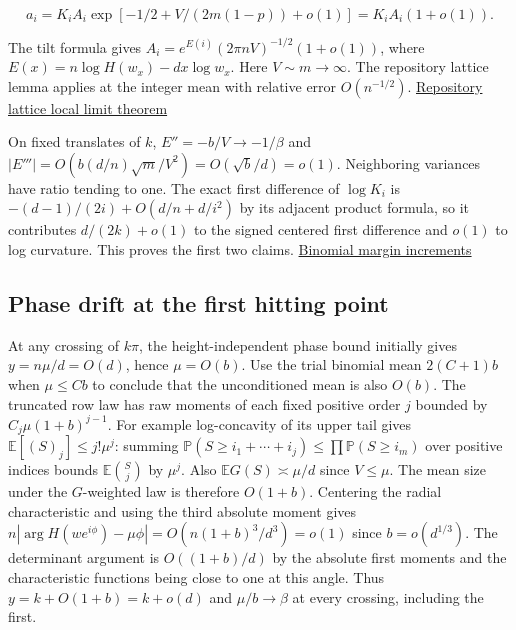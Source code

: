 \begin{equation*}
a_i=K_i A_i\exp[-1/2+V/(2m(1-p))+o(1)]=K_i A_i(1+o(1)).
\end{equation*}

The tilt formula gives $A_i=e^{E(i)}(2\pi n V)^{-1/2}(1+o(1))$, where $E(x)=n\log H(w_x)-dx\log w_x$. Here $V\sim m\to\infty$. The repository lattice lemma applies at the integer mean with relative error $O(n^{-1/2})$. \href{https://github.com/ProgramComputer/open-math-research/blob/605cc467a5be93a8408519da331e46f1008df96e/topics/balanced-arrays/dense-regime/uniform-lattice-lemma.md}{Repository lattice local limit theorem}

On fixed translates of $k$, $E''=-b/V\to-1/\beta$ and $|E'''|=O(b(d/n)\sqrt m/V^2)=O(\sqrt b/d)=o(1)$. Neighboring variances have ratio tending to one. The exact first difference of $\log K_i$ is $-(d-1)/(2i)+O(d/n+d/i^2)$ by its adjacent product formula, so it contributes $d/(2k)+o(1)$ to the signed centered first difference and $o(1)$ to log curvature. This proves the first two claims. \href{https://github.com/ProgramComputer/open-math-research/blob/4fb624ba937a8eecc1361a6066185cd81ab7b172/topics/balanced-arrays/quadratic/quadratic-lower-quota.md}{Binomial margin increments}

\subsection{Phase drift at the first hitting point}

At any crossing of $k\pi$, the height-independent phase bound initially gives $y=n\mu/d=O(d)$, hence $\mu=O(b)$. Use the trial binomial mean $2(C+1)b$ when $\mu\le Cb$ to conclude that the unconditioned mean is also $O(b)$. The truncated row law has raw moments of each fixed positive order $j$ bounded by $C_j\mu(1+b)^{j-1}$. For example log-concavity of its upper tail gives $\mathbb E[(S)_j]\le j!\mu^j$: summing $\mathbb P(S\ge i_1+\cdots+i_j)\le\prod \mathbb P(S\ge i_m)$ over positive indices bounds $\mathbb E\binom Sj$ by $\mu^j$. Also $\mathbb E G(S)\asymp \mu/d$ since $V\le\mu$. The mean size under the $G$-weighted law is therefore $O(1+b)$. Centering the radial characteristic and using the third absolute moment gives $n|\arg H(we^{i\phi})-\mu\phi|=O(n(1+b)^3/d^3)=o(1)$ since $b=o(d^{1/3})$. The determinant argument is $O((1+b)/d)$ by the absolute first moments and the characteristic functions being close to one at this angle. Thus $y=k+O(1+b)=k+o(d)$ and $\mu/b\to\beta$ at every crossing, including the first.

